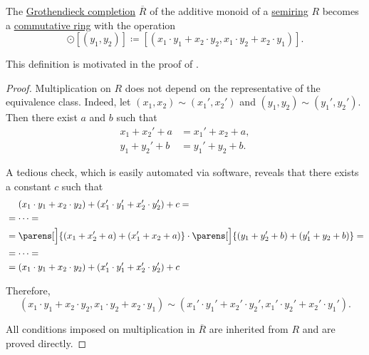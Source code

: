\begin{proposition}\label{thm:semiring_grothendieck_completion}
  The \hyperref[def:monoid_grothendieck_completion]{Grothendieck completion} \( \overline{R} \) of the additive monoid of a \hyperref[def:semiring]{semiring} \( R \) becomes a \hyperref[def:ring/commutative]{commutative ring} with the operation
  \begin{equation*}
    [(x_1, x_2)] \odot [(y_1, y_2)] \coloneqq [(x_1 \cdot y_1 + x_2 \cdot y_2, x_1 \cdot y_2 + x_2 \cdot y_1)].
  \end{equation*}

  This definition is motivated in the proof of .
\end{proposition}
\begin{proof}
  Multiplication on \( R \) does not depend on the representative of the equivalence class. Indeed, let \( (x_1, x_2) \sim (x_1', x_2') \) and \( (y_1, y_2) \sim (y_1', y_2') \). Then there exist \( a \) and \( b \) such that
  \begin{align*}
    x_1 + x_2' + a &= x_1' + x_2 + a, \\
    y_1 + y_2' + b &= y_1' + y_2 + b.
  \end{align*}

  A tedious check, which is easily automated via software, reveals that there exists a constant \( c \) such that
  \begin{align*}
    &\phantom{{}={}}
    (x_1 \cdot y_1 + x_2 \cdot y_2) + (x_1' \cdot y_1' + x_2' \cdot y_2') + c
    = \\ &=
    \cdots
    = \\ &=
    \parens[\Big]{ (x_1 + x_2' + a) + (x_1' + x_2 + a) } \cdot \parens[\Big]{ (y_1 + y_2' + b) + (y_1' + y_2 + b) }
    = \\ &=
    \cdots
    = \\ &=
    (x_1 \cdot y_1 + x_2 \cdot y_2) + (x_1' \cdot y_1' + x_2' \cdot y_2') + c
  \end{align*}

  Therefore,
  \begin{equation*}
    (x_1 \cdot y_1 + x_2 \cdot y_2, x_1 \cdot y_2 + x_2 \cdot y_1) \sim (x_1' \cdot y_1' + x_2' \cdot y_2', x_1' \cdot y_2' + x_2' \cdot y_1').
  \end{equation*}

  All conditions imposed on multiplication in \( \overline{R} \) are inherited from \( R \) and are proved directly.
\end{proof}

